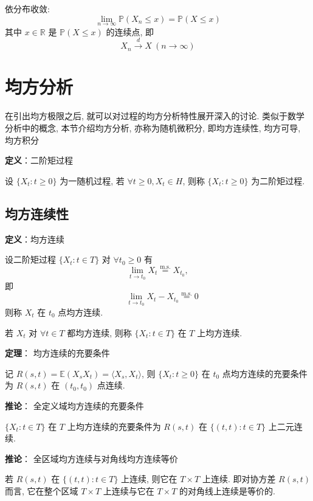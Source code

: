 \documentclass[openany]{ctexbook}
\theoremstyle{kaiti}
\theoremstyle{normal}
\begin{document}
依分布收敛:
\begin{equation}
  \lim_{n\to\infty}\mathbb{P}(X_n\leqslant x)=\mathbb{P}(X\leqslant x)
\end{equation}
其中 $x\in\mathbb{R}$ 是 $\mathbb{P}(X\leqslant x)$ 的连续点, 即
\begin{equation}
  X_n\overset{d}{\to}X~(n\to\infty)
\end{equation}

\section{均方分析}

在引出均方极限之后, 就可以对过程的均方分析特性展开深入的讨论. 类似于数学分析中的概念, 本节介绍均方分析, 亦称为随机微积分, 即均方连续性, 均方可导, 均方积分

\textbf{定义}：二阶矩过程

设 $\{X_t:t\geqslant0\}$ 为一随机过程, 若 $\forall t\geqslant0,X_t\in H$, 则称 $\{X_t:t\geqslant0\}$ 为二阶矩过程.

\subsection{均方连续性}

\textbf{定义}：均方连续

设二阶矩过程 $\{X_t:t\in T\}$ 对 $\forall t_0\geqslant0$ 有
\begin{equation}
  \lim_{t\to t_0}X_t\overset{\mathrm{m.s.}}{=}X_{t_0},
\end{equation}
即
\begin{equation}
  \quad\lim_{t\to t_0}X_t-X_{t_0}\overset{\mathrm{m.s.}}{=}0
\end{equation}
则称 $X_t$ 在 $t_0$ 点均方连续.

若 $X_t$ 对 $\forall t\in T$ 都均方连续, 则称 $\{X_t:t\in T\}$ 在 $T$ 上均方连续.

\textbf{定理}： 均方连续的充要条件

记 $R(s,t)=\mathbb{E}(X_sX_t)=\langle X_s,X_t\rangle$, 则 $\{X_t:t\geqslant0\}$ 在 $t_0$ 点均方连续的充要条件为 $R(s,t)$ 在 $(t_0,t_0)$ 点连续.

\textbf{推论}： 全定义域均方连续的充要条件

$\{X_t:t\in T\}$ 在 $T$ 上均方连续的充要条件为 $R(s,t)$ 在 $\{(t,t):t\in T\}$ 上二元连续.

\textbf{推论}： 全区域均方连续与对角线均方连续等价

若 $R(s,t)$ 在 $\{(t,t):t\in T\}$ 上连续, 则它在 $T\times T$ 上连续. 即对协方差 $R(s,t)$ 而言, 它在整个区域 $T\times T$ 上连续与它在 $T\times T$ 的对角线上连续是等价的.
\end{document}
